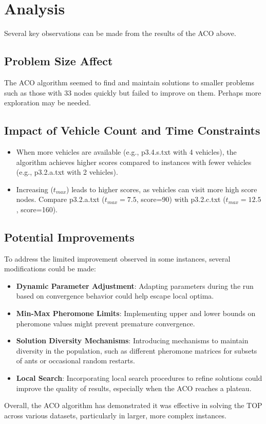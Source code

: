 \documentclass[a4paper,12pt]{article}
\begin{document}
\clearpage
\section{Analysis}

Several key observations can be made from the results of the ACO above.

\subsection{Problem Size Affect}

The ACO algorithm seemed to find and maintain solutions to smaller problems such as those with 33 nodes quickly but failed to improve on them. Perhaps more exploration may be needed.

\subsection{Impact of Vehicle Count and Time Constraints}

\begin{itemize}
    \item When more vehicles are available (e.g., p3.4.s.txt with 4 vehicles), the algorithm achieves higher scores compared to instances with fewer vehicles (e.g., p3.2.a.txt with 2 vehicles).
    \item Increasing ($t_{max}$) leads to higher scores, as vehicles can visit more high score nodes. Compare p3.2.a.txt ($t_{max}=7.5$, score=90) with p3.2.c.txt ($t_{max}=12.5$, score=160).
\end{itemize}

\subsection{Potential Improvements}

To address the limited improvement observed in some instances, several modifications could be made:

\begin{itemize}
    \item \textbf{Dynamic Parameter Adjustment}: Adapting parameters during the run based on convergence behavior could help escape local optima.
    
    \item \textbf{Min-Max Pheromone Limits}: Implementing upper and lower bounds on pheromone values might prevent premature convergence.
    
    \item \textbf{Solution Diversity Mechanisms}: Introducing mechanisms to maintain diversity in the population, such as different pheromone matrices for subsets of ants or occasional random restarts.
    
    \item \textbf{Local Search}: Incorporating local search procedures to refine solutions could improve the quality of results, especially when the ACO reaches a plateau.
\end{itemize}

Overall, the ACO algorithm has demonstrated it was effective in solving the TOP across various datasets, particularly in larger, more complex instances.
\end{document}
